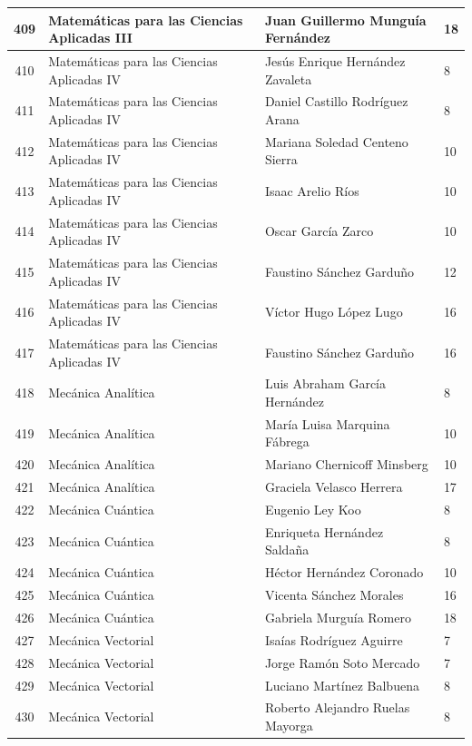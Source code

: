 {\begin{longtable}{|c|p{6.5cm}|p{5cm}|p{1.5cm}|}
  409 & Matemáticas para las Ciencias Aplicadas III & Juan Guillermo Munguía Fernández & 18 \\ \hline 
  410 & Matemáticas para las Ciencias Aplicadas IV & Jesús Enrique Hernández Zavaleta & 8 \\ \hline 
  411 & Matemáticas para las Ciencias Aplicadas IV & Daniel Castillo Rodríguez Arana & 8 \\ \hline 
  412 & Matemáticas para las Ciencias Aplicadas IV & Mariana Soledad Centeno Sierra & 10 \\ \hline 
  413 & Matemáticas para las Ciencias Aplicadas IV & Isaac Arelio Ríos & 10 \\ \hline 
  414 & Matemáticas para las Ciencias Aplicadas IV & Oscar García Zarco & 10 \\ \hline 
  415 & Matemáticas para las Ciencias Aplicadas IV & Faustino Sánchez Garduño & 12 \\ \hline 
  416 & Matemáticas para las Ciencias Aplicadas IV & Víctor Hugo López Lugo & 16 \\ \hline 
  417 & Matemáticas para las Ciencias Aplicadas IV & Faustino Sánchez Garduño & 16 \\ \hline 
  418 & Mecánica Analítica & Luis Abraham García Hernández & 8 \\ \hline 
  419 & Mecánica Analítica & María Luisa Marquina Fábrega & 10 \\ \hline 
  420 & Mecánica Analítica & Mariano Chernicoff Minsberg & 10 \\ \hline 
  421 & Mecánica Analítica & Graciela Velasco Herrera & 17 \\ \hline 
  422 & Mecánica Cuántica & Eugenio Ley Koo & 8 \\ \hline 
  423 & Mecánica Cuántica & Enriqueta Hernández Saldaña & 8 \\ \hline 
  424 & Mecánica Cuántica & Héctor Hernández Coronado & 10 \\ \hline 
  425 & Mecánica Cuántica & Vicenta Sánchez Morales & 16 \\ \hline 
  426 & Mecánica Cuántica & Gabriela Murguía Romero & 18 \\ \hline 
  427 & Mecánica Vectorial & Isaías Rodríguez Aguirre & 7 \\ \hline 
  428 & Mecánica Vectorial & Jorge Ramón Soto Mercado & 7 \\ \hline 
  429 & Mecánica Vectorial & Luciano Martínez Balbuena & 8 \\ \hline 
  430 & Mecánica Vectorial & Roberto Alejandro Ruelas Mayorga & 8 \\ \hline 

\end{longtable}}
